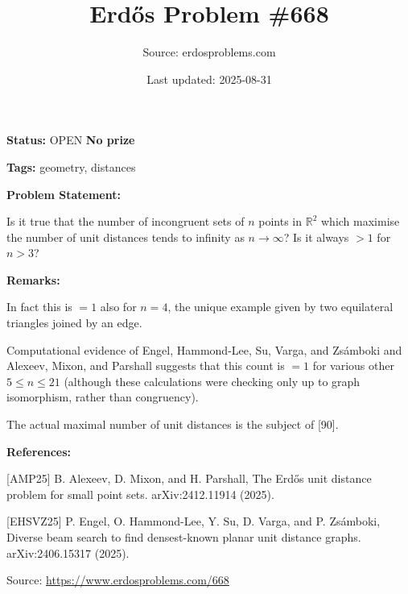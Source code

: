 \documentclass{article}
\title{Erd\H{o}s Problem \#668}
\date{Last updated: 2025-08-31}
\author{Source: erdosproblems.com}
\begin{document}
\maketitle

\noindent\textbf{Status:} OPEN \quad \textbf{No prize}

\noindent\textbf{Tags:} geometry, distances

\medskip
\noindent\textbf{Problem Statement:}

Is it true that the number of incongruent sets of $n$ points in $\mathbb{R}^2$ which maximise the number of unit distances tends to infinity as $n\to\infty$? Is it always $>1$ for $n>3$?

\bigskip
\noindent\textbf{Remarks:}

In fact this is $=1$ also for $n=4$, the unique example given by two equilateral triangles joined by an edge. 

Computational evidence of Engel, Hammond-Lee, Su, Varga, and Zs\'{a}mboki \cite{EHSVZ25} and Alexeev, Mixon, and Parshall \cite{AMP25} suggests that this count is $=1$ for various other $5\leq n\leq 21$ (although these calculations were checking only up to graph isomorphism, rather than congruency). 

The actual maximal number of unit distances is the subject of [90].

\bigskip
\noindent\textbf{References:}

[AMP25] B. Alexeev, D. Mixon, and H. Parshall, The Erd\H{o}s unit distance problem for small point sets. arXiv:2412.11914 (2025).
 
 [EHSVZ25] P. Engel, O. Hammond-Lee, Y. Su, D. Varga, and P. Zs\'{a}mboki, Diverse beam search to find densest-known planar unit distance graphs. arXiv:2406.15317 (2025).

\bigskip
\noindent\small{Source: \url{https://www.erdosproblems.com/668}}
\end{document}
